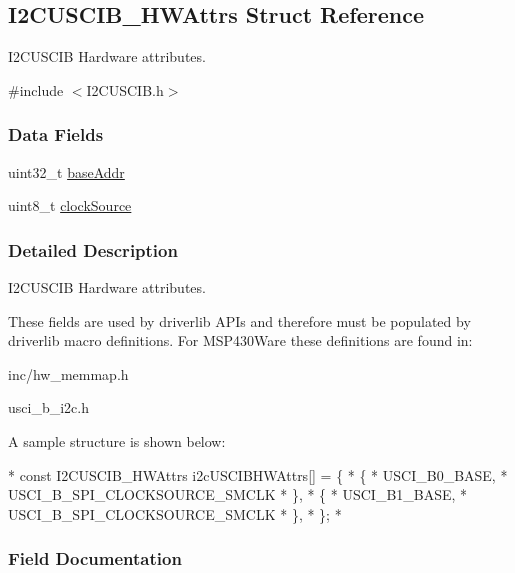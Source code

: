 \subsection{I2\-C\-U\-S\-C\-I\-B\-\_\-\-H\-W\-Attrs Struct Reference}
\label{struct_i2_c_u_s_c_i_b___h_w_attrs}


I2\-C\-U\-S\-C\-I\-B Hardware attributes.  




{\ttfamily \#include $<$I2\-C\-U\-S\-C\-I\-B.\-h$>$}

\subsubsection*{Data Fields}
\begin{DoxyCompactItemize}
\item 
uint32\-\_\-t \hyperlink{struct_i2_c_u_s_c_i_b___h_w_attrs_ac86e653a2babe8e0e8c20d044d7f87ad}{base\-Addr}
\item 
uint8\-\_\-t \hyperlink{struct_i2_c_u_s_c_i_b___h_w_attrs_aca93346c6e87c42ee11c3742bd85e79d}{clock\-Source}
\end{DoxyCompactItemize}


\subsubsection{Detailed Description}
I2\-C\-U\-S\-C\-I\-B Hardware attributes. 

These fields are used by driverlib A\-P\-Is and therefore must be populated by driverlib macro definitions. For M\-S\-P430\-Ware these definitions are found in\-:
\begin{DoxyItemize}
\item inc/hw\-\_\-memmap.\-h
\item usci\-\_\-b\-\_\-i2c.\-h
\end{DoxyItemize}

A sample structure is shown below\-: 
\begin{DoxyCode}
*  \textcolor{keyword}{const} I2CUSCIB_HWAttrs i2cUSCIBHWAttrs[] = \{
*      \{
*          USCI\_B0\_BASE,
*          USCI\_B\_SPI\_CLOCKSOURCE\_SMCLK
*      \},
*      \{
*          USCI\_B1\_BASE,
*          USCI\_B\_SPI\_CLOCKSOURCE\_SMCLK
*      \},
*  \};
*  
\end{DoxyCode}
 

\subsubsection{Field Documentation}
